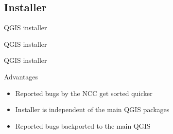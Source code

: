 \subsection{Installer}
\begin{frame}{QGIS installer}


\end{frame}


\begin{frame}{QGIS installer}
	
	
\end{frame}

\begin{frame}{QGIS installer}
		\begin{block}{Advantages}
			\begin{itemize}
				\item Reported bugs by the NCC get sorted quicker
				\item Installer is independent of the main QGIS packages
				\item Reported bugs backported to the main QGIS
			\end{itemize}
		\end{block}
	
\end{frame}

